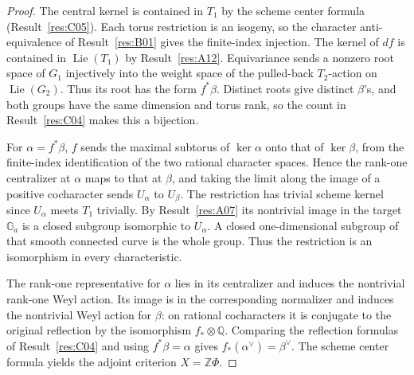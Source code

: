 \documentclass[11pt,a4paper,openany,oneside]{book}
\theoremstyle{resultstyle}
\theoremstyle{definition}
\numberwithin{equation}{chapter}
\newcommand{\Ga}{\mathbb{G}_a}
\DeclareMathOperator{\Lie}{Lie}
\newcommand{\ZZ}{\mathbb{Z}}
\newcommand{\QQ}{\mathbb{Q}}
\begin{document}
\begin{proof}
The central kernel is contained in \(T_1\) by the scheme
center formula (Result~\ref{res:C05}). Each torus restriction
is an isogeny, so the character anti-equivalence of
Result~\ref{res:B01} gives the finite-index injection.
The kernel of \(df\) is contained in \(\Lie(T_1)\) by
Result~\ref{res:A12}. Equivariance sends a nonzero root
space of \(G_1\) injectively into the weight space of the
pulled-back \(T_2\)-action on \(\Lie(G_2)\). Thus its root
has the form \(f^*\beta\). Distinct roots give distinct
\(\beta\)'s, and both groups have the same dimension and
torus rank, so the count in Result~\ref{res:C04} makes
this a bijection.

For \(\alpha=f^*\beta\), \(f\) sends the maximal subtorus
of \(\ker\alpha\) onto that of \(\ker\beta\), from the
finite-index identification of the two rational character
spaces. Hence the rank-one centralizer at \(\alpha\) maps to
that at \(\beta\), and taking the limit along the image of a
positive cocharacter sends \(U_\alpha\) to \(U_\beta\).
The restriction has trivial scheme kernel since \(U_\alpha\)
meets \(T_1\) trivially. By Result~\ref{res:A07} its nontrivial
image in the target \(\Ga\) is a closed subgroup isomorphic
to \(U_\alpha\). A closed one-dimensional subgroup of that
smooth connected curve is the whole group. Thus the restriction
is an isomorphism in every characteristic.

The rank-one representative for \(\alpha\) lies in its
centralizer and induces the nontrivial rank-one Weyl action.
Its image is in the corresponding normalizer and induces
the nontrivial Weyl action for \(\beta\): on rational
cocharacters it is conjugate to the original reflection by
the isomorphism \(f_* \otimes \QQ\).
Comparing the reflection formulas of Result~\ref{res:C04}
and using \(f^*\beta=\alpha\) gives
\(f_*(\alpha^\vee)=\beta^\vee\).
The scheme center formula yields the adjoint criterion
\(X=\ZZ\Phi\).


\end{proof}
\end{document}
